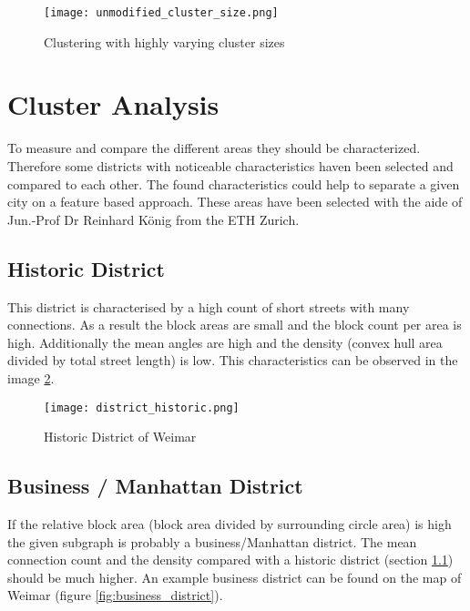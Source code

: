 \begin{figure}
    \centering
    \begin{mdframed}[style=mdthight, userdefinedwidth=0.5\linewidth, align=center]
        \texttt{[image: unmodified\_cluster\_size.png]}
    \end{mdframed}
    \caption{Clustering with highly varying cluster sizes}
    \label{fig:problem_unmodified_cluster_size}
\end{figure}

\pagebreak
\section{Cluster Analysis}
\label{sec:concept_cluster_analysis}
To measure and compare the different areas they should be characterized. Therefore some districts with noticeable characteristics haven been selected and compared to each other. The found characteristics could help to separate a given city on a feature based approach.
These areas have been selected with the aide of Jun.-Prof Dr Reinhard König from the ETH Zurich.

\subsection{Historic District}
\label{sec:historyDistinct}
This district is characterised by a high count of short streets with many connections. As a result the block areas are small and the block count per area is high. Additionally the mean angles are high and the density (convex hull area divided by total street length) is low. This characteristics can be observed in the image \ref{fig:historic_district}.

\begin{figure}[!ht]
    \centering
    \begin{mdframed}[style=mdthight, userdefinedwidth=0.4\textwidth, align=center]
        \texttt{[image: district\_historic.png]}
    \end{mdframed}
    \caption{Historic District of Weimar}
    \label{fig:historic_district}
\end{figure}

\FloatBarrier
\subsection{Business / Manhattan District} 
\label{sec:businessDistinct}
If the relative block area (block area divided by surrounding circle area) is high the given subgraph is probably a business/Manhattan district. The mean connection count and the density compared with a historic district (section \ref{sec:historyDistinct}) should be much higher. An example business district can be found on the map of Weimar (figure \ref{fig:business_district}).

